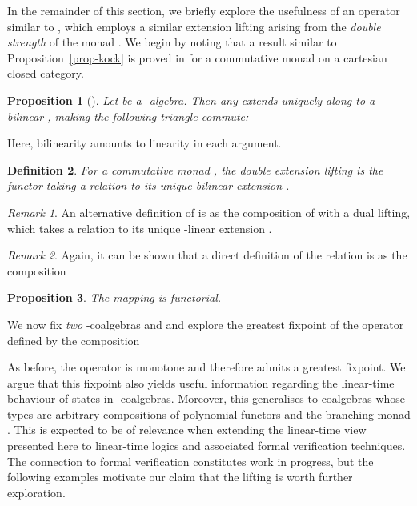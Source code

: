 \documentclass[submission,copyright,creativecommons]{eptcs}
\theoremstyle{plain}\newtheorem{theorem}{Theorem}[section]
\newtheorem{proposition}[theorem]{Proposition}
\newtheorem{definition}[theorem]{Definition}
\theoremstyle{remark}
\newtheorem{remark}{Remark}[section]
\begin{document}
In the remainder of this section, we briefly explore the usefulness of an operator similar to , which employs a similar extension lifting arising from the \emph{double strength} of the monad . We begin by noting that a result similar to Proposition~\ref{prop-kock} is proved in \cite{Kock12} for a commutative monad on a cartesian closed category.
\begin{proposition}[{\cite[Proposition~9.3]{Kock12}}]
Let  be a -algebra. Then any  extends uniquely along  to a bilinear , making the following triangle commute:

\end{proposition}
Here, bilinearity amounts to linearity in each argument.
\begin{definition}
For a commutative monad , the \emph{double extension lifting}  is the functor taking a relation  to its unique bilinear extension .
\end{definition}
\begin{remark}
\label{alt-lifting}
An alternative definition of  is as the composition of  with a dual lifting, which takes a relation  to its unique -linear extension .
\end{remark}
\begin{remark}
Again, it can be shown that a direct definition of the relation  is as the composition

\end{remark}

\begin{proposition}
\label{prop-functoriality-dual}
The mapping  is functorial.
\end{proposition}
We now fix \emph{two} -coalgebras  and  and explore the greatest fixpoint of the operator  defined by the composition


As before, the operator  is monotone and therefore admits a greatest fixpoint. We argue that this fixpoint also yields useful information regarding the linear-time behaviour of states in -coalgebras. Moreover, this generalises to coalgebras whose types are arbitrary compositions of polynomial functors and the branching monad . This is expected to be of relevance when extending the linear-time view presented here to linear-time logics and associated formal verification techniques. The connection to formal verification constitutes work in progress, but the following examples motivate our claim that the lifting  is worth further exploration.
\end{document}
